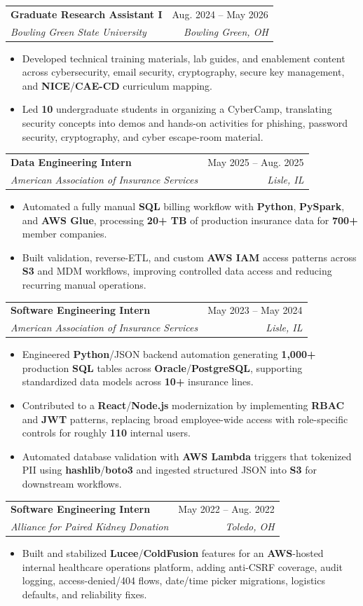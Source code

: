 \documentclass[letterpaper,11pt]{article}
\makeatletter
\newcommand{\resumeItem}[1]{
  \item\small{
    {#1 \vspace{-3pt}}
  }
}
\newcommand{\resumeSubheading}[4]{
  \vspace{-2pt}\item
    \begin{tabular*}{0.97\textwidth}[t]{l@{\extracolsep{\fill}}r}
      \textbf{#1} & #2 \\
      \textit{\small#3} & \textit{\small #4} \\
    \end{tabular*}\vspace{-4pt}
}
\newcommand{\resumeItemListStart}{\begin{itemize}[leftmargin=0.16in, itemsep=0pt, topsep=0pt, parsep=0pt]}
\newcommand{\resumeItemListEnd}{\end{itemize}\vspace{-6pt}}
\makeatother
\begin{document}
    \resumeSubheading
      {Graduate Research Assistant I}{Aug. 2024 -- May 2026}
      {Bowling Green State University}{Bowling Green, OH}
      \resumeItemListStart
        \resumeItem{Developed technical training materials, lab guides, and enablement content across cybersecurity, email security, cryptography, secure key management, and \textbf{NICE}/\textbf{CAE-CD} curriculum mapping.}
        \resumeItem{Led \textbf{10} undergraduate students in organizing a CyberCamp, translating security concepts into demos and hands-on activities for phishing, password security, cryptography, and cyber escape-room material.}
      \resumeItemListEnd

    \resumeSubheading
      {Data Engineering Intern}{May 2025 -- Aug. 2025}
      {American Association of Insurance Services}{Lisle, IL}
      \resumeItemListStart
        \resumeItem{Automated a fully manual \textbf{SQL} billing workflow with \textbf{Python}, \textbf{PySpark}, and \textbf{AWS Glue}, processing \textbf{20+ TB} of production insurance data for \textbf{700+} member companies.}
        \resumeItem{Built validation, reverse-ETL, and custom \textbf{AWS IAM} access patterns across \textbf{S3} and MDM workflows, improving controlled data access and reducing recurring manual operations.}
      \resumeItemListEnd

    \resumeSubheading
      {Software Engineering Intern}{May 2023 -- May 2024}
      {American Association of Insurance Services}{Lisle, IL}
      \resumeItemListStart
        \resumeItem{Engineered \textbf{Python}/JSON backend automation generating \textbf{1,000+} production \textbf{SQL} tables across \textbf{Oracle}/\textbf{PostgreSQL}, supporting standardized data models across \textbf{10+} insurance lines.}
        \resumeItem{Contributed to a \textbf{React}/\textbf{Node.js} modernization by implementing \textbf{RBAC} and \textbf{JWT} patterns, replacing broad employee-wide access with role-specific controls for roughly \textbf{110} internal users.}
        \resumeItem{Automated database validation with \textbf{AWS Lambda} triggers that tokenized PII using \textbf{hashlib}/\textbf{boto3} and ingested structured JSON into \textbf{S3} for downstream workflows.}
      \resumeItemListEnd

    \resumeSubheading
      {Software Engineering Intern}{May 2022 -- Aug. 2022}
      {Alliance for Paired Kidney Donation}{Toledo, OH}
      \resumeItemListStart
        \resumeItem{Built and stabilized \textbf{Lucee}/\textbf{ColdFusion} features for an \textbf{AWS}-hosted internal healthcare operations platform, adding anti-CSRF coverage, audit logging, access-denied/404 flows, date/time picker migrations, logistics defaults, and reliability fixes.}
      \resumeItemListEnd
\end{document}
